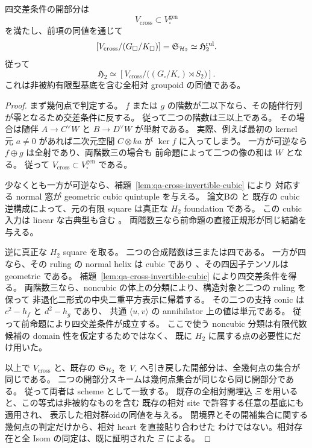 \begin{theorem}[全$H_2$開の有限明示判定]
\label{thm:qa-square-explicit-h2-open}
四交差条件の開部分は
\[
 V_{\mathrm{cross}}\subset V_\square^{\mathrm{gen}}
\]
を満たし、前項の同値を通じて
\[
 [V_{\mathrm{cross}}/(G_\square/K_\square)]
   =\mathfrak S_{\mathcal H_2}\simeq\mathfrak H_2^{\mathrm{rul}}.
\]
従って
\[
 \mathfrak H_2\simeq
 \left[V_{\mathrm{cross}}\Big/
       \big((G_\square/K_\square)\rtimes S_2\big)\right].
\]
これは非被約有限型基底を含む全相対 groupoid の同値である。
\end{theorem}
\begin{proof}
まず幾何点で判定する。
$f$ または $g$ の階数が二以下なら、その随伴行列が零となるため交差条件に反する。
従って二つの階数は三以上である。
その場合は随伴 $A\to C^\vee W$ と $B\to D^\vee W$ が単射である。
実際、例えば最初の kernel 元 $a\ne0$ があれば二次元空間 $C\otimes ka$
が $\ker f$ に入ってしまう。
一方が可逆なら $f\oplus g$ は全射であり、両階数三の場合も
前命題によって二つの像の和は $W$ となる。
従って $V_{\mathrm{cross}}\subset V_\square^{\mathrm{gen}}$ である。

少なくとも一方が可逆なら、補題~\ref{lem:qa-cross-invertible-cubic} により
対応する normal 窓が geometric cubic quintuple を与える。
論文Bの\cite[\texttt{prop:cubic-foundation-open}]{QuadricModuli2026} と
既存の cubic 逆構成によって、元の有限 square は真正な $H_2$ foundation である。
この cubic 入力は linear な古典型も含む
\cite[Lemma 5.3.3, Theorem 5.5.10]{VdB2011}。
両階数三なら前命題の直接正規形が同じ結論を与える。

逆に真正な $H_2$ square を取る。
二つの合成階数は三または四である。
一方が四なら、その ruling の normal helix は cubic であり
\cite[\texttt{thm:cubic-coverage},\texttt{cor:normal-cubic-defect}]
{QuadricIntrinsic2026}、その四因子テンソルは geometric である。
補題~\ref{lem:qa-cross-invertible-cubic} により四交差条件を得る。
両階数三なら、noncubic の体上の分類により、構造対象と二つの ruling を保って
非退化二形式の中央二重平方表示に帰着する。
その二つの支持 conic は $c^2-h_f$ と $d^2-h_g$ であり、
共通 $\langle u,v\rangle$ の annihilator 上の値は単元である。
従って前命題により四交差条件が成立する。
ここで使う noncubic 分類は有限代数候補の domain 性を仮定するためではなく、
既に $H_2$ に属する点の必要性にだけ用いた。

以上で $V_{\mathrm{cross}}$ と、既存の $\mathfrak S_{\mathcal H_2}$ を
$V_\square$ へ引き戻した開部分は、全幾何点の集合が同じである。
二つの開部分スキームは幾何点集合が同じなら同じ開部分である。
従って両者は scheme として一致する。
既存の全相対開埋込 $\Xi$ を用いると、この等式は非被約なものを含む
既存の相対 site で許容する任意の基底にも適用され、
表示した相対群oidの同値を与える。
閉境界とその開補集合に関する幾何点の判定だけから、相対 heart を直接貼り合わせた
わけではない。相対存在と全 Isom の同定は、既に証明された $\Xi$ による。
\end{proof}

